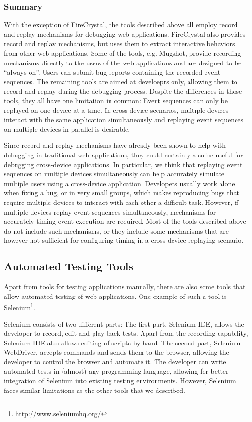 \subsubsection{Summary}

With the exception of FireCrystal, the tools described above all employ record and replay mechanisms for debugging web applications. FireCrystal also provides record and replay mechanisms, but uses them to extract interactive behaviors from other web applications. Some of the tools, e.g. Mugshot, provide recording mechanisms directly to the users of the web applications and are designed to be ``always-on''. Users can submit bug reports containing the recorded event sequences. The remaining tools are aimed at develoeprs only, allowing them to record and replay during the debugging process. Despite the differences in those tools, they all have one limitation in common: Event sequences can only be replayed on one device at a time. In cross-device scenarios, multiple devices interact with the same application simultaneously and replaying event sequences on multiple devices in parallel is desirable.

Since record and replay mechanisms have already been shown to help with debugging in traditional web applications, they could certainly also be useful for debugging cross-device applications. In particular, we think that replaying event sequences on multiple devices simultaneously can help accurately simulate multiple users using a cross-device application. Developers usually work alone when fixing a bug, or in very small groups, which makes reproducing bugs that require multiple devices to interact with each other a difficult task. However, if multiple devices replay event sequences simultaneously, mechanisms for accurately timing event execution are required. Most of the tools described above do not include such mechanisms, or they include some mechanisms that are however not sufficient for configuring timing in a cross-device replaying scenario.

\subsection{Automated Testing Tools}

Apart from tools for testing applications manually, there are also some tools that allow automated testing of web applications. One example of such a tool is Selenium\footnote{\url{http://www.seleniumhq.org/}}.

Selenium consists of two different parts: The first part, Selenium IDE, allows the developer to record, edit and play back tests. Apart from the recording capability, Selenium IDE also allows editing of scripts by hand. The second part, Selenium WebDriver, accepts commands and sends them to the browser, allowing the developer to control the browser and automate it. The developer can write automated tests in (almost) any programming language, allowing for better integration of Selenium into existing testing environments. However, Selenium faces similar limitations as the other tools that we described.

